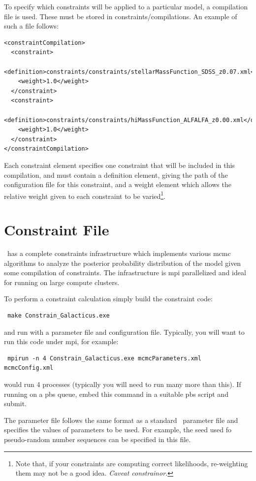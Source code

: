 To specify which constraints will be applied to a particular model, a compilation file is used. These must be stored in {\normalfont \ttfamily constraints/compilations}. An example of such a file follows:
\begin{verbatim}
<constraintCompilation>
  <constraint>
    <definition>constraints/constraints/stellarMassFunction_SDSS_z0.07.xml</definition>
    <weight>1.0</weight>
  </constraint>
  <constraint>
    <definition>constraints/constraints/hiMassFunction_ALFALFA_z0.00.xml</definition>
    <weight>1.0</weight>
  </constraint>
</constraintCompilation>
\end{verbatim}
Each {\normalfont \ttfamily constraint} element specifies one constraint that will be included in this compilation, and must contain a {\normalfont \ttfamily definition} element, giving the path of the configuration file for this constraint, and a {\normalfont \ttfamily weight} element which allows the relative weight given to each constraint to be varied\footnote{Note that, if your constraints are computing correct likelihoods, re-weighting them may not be a good idea. \emph{Caveat constrainor.}}.

\section{Constraint File}

\glc\ has a complete constraints infrastructure which implements various \gls{mcmc} algorithms to analyze the posterior probability distribution of the model given some compilation of constraints. The infrastructure is \gls{mpi} parallelized and ideal for running on large compute clusters.

To perform a constraint calculation simply build the constraint code:
\begin{verbatim}
 make Constrain_Galacticus.exe
\end{verbatim}
and run with a parameter file and configuration file. Typically, you will want to run this code under \gls{mpi}, for example:
\begin{verbatim}
 mpirun -n 4 Constrain_Galacticus.exe mcmcParameters.xml mcmcConfig.xml
\end{verbatim}
would run 4 processes (typically you will need to run many more than this). If running on a \gls{pbs} queue, embed this command in a suitable \gls{pbs} script and submit. 

The parameter file follows the same format as a standard \glc\ parameter file and specifies the values of parameters to be used. For example, the seed used fo pseudo-random number sequences can be specified in this file. 

